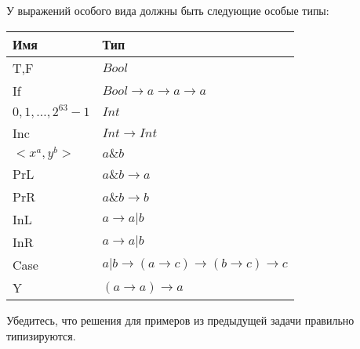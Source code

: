 \documentclass[12pt,a4paper,oneside]{article}
\begin{document}
\begin{enumerate}
У выражений особого вида должны быть следующие особые типы:

\begin{tabular}{ll}
Имя & Тип\\
\hline
T,F & $Bool$\\
If & $Bool \rightarrow a \rightarrow a \rightarrow a $\\
$0,1,\dots,2^{63}-1$ & $Int$\\
Inc & $Int \rightarrow Int$\\
$< x^a, y^b >$ & $a \& b$\\
PrL & $a\&b \rightarrow a$\\
PrR & $a\&b \rightarrow b$\\
InL & $a \rightarrow a | b$\\
InR & $a \rightarrow a | b$\\
Case & $a | b \rightarrow (a\rightarrow c) \rightarrow (b\rightarrow c) \rightarrow c$\\
Y & $(a \rightarrow a) \rightarrow a$
\end{tabular}%

Убедитесь, что решения для примеров из предыдущей задачи правильно типизируются.

\end{enumerate}
\end{document}
